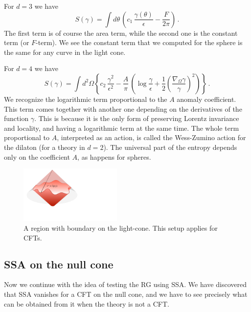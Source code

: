 \documentclass[12pt]{article}
\numberwithin{equation}{section}
\newcommand{\be}{\begin{equation}}
\newcommand{\ee}{\end{equation}}
\begin{document}
For $d=3$ we have 
\be
S(\gamma)=\int d\theta\,\left (c_1\, \frac{\gamma(\theta)}{\epsilon} -\frac{F}{2\pi} \right)\,.\label{tresd}
\ee
The first term is of course the area term, while the second one is the constant term (or $F$-term). We see the constant term that we computed for the sphere is the same for any curve in the light cone. 

For $d=4$ we have
\be
S(\gamma) = \int d^2 \Omega \left \lbrace  c_2\, \frac{\gamma^2}{\epsilon^2}- \frac{A}{\pi} \,  \left(\log \frac{\gamma}{\epsilon} + \frac{1}{2}\left(\frac{\nabla_\Omega \gamma}{\gamma} \right)^2 \right) \right \rbrace\,.\label{cuatrod}
\ee
We recognize the logarithmic term proportional to the $A$ anomaly coefficient. This term comes together with another one depending on the derivatives of the function $\gamma$. This is because it is the only form of preserving Lorentz invariance and locality, and having a logarithmic term at the same time. The whole term proportional to $A$, interpreted as an action, is called the Wess-Zumino action for the dilaton (for a theory in $d=2$). The universal part of the entropy depends only on the coefficient $A$, as happens for spheres.   

\begin{figure}[t]
\begin{center}
\includegraphics[width=0.45\textwidth]{nullcone.pdf} 
\caption{A region with boundary on the light-cone. This setup applies for CFTs.}
\label{rmenos}
\end{center}
\end{figure}

\subsection{SSA on the null cone}
Now we continue with the idea of testing the RG using SSA. We have discovered that SSA vanishes for a CFT on the null cone, and we have to see precisely what can be obtained from it when the theory is not a CFT. 
\end{document}
